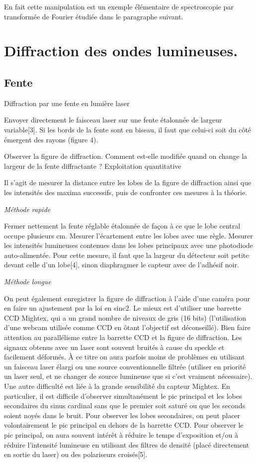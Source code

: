 \documentclass{article}%
\begin{document}
En fait cette manipulation est un exemple élémentaire de spectroscopie par transformée de Fourier étudiée dans le paragraphe suivant. 

\section{Diffraction des ondes lumineuses.}
\subsection{Fente}
Diffraction par une fente en lumière laser

Envoyer directement le faisceau laser sur une fente étalonnée de largeur variable[3]. Si les bords de la fente sont en biseau, il faut que celui-ci soit du côté émergent des rayons (figure 4).

Observer la figure de diffraction. Comment est-elle modifiée quand on change la largeur de la fente diffractante ?
Exploitation quantitative

Il s'agit de mesurer la distance entre les lobes de la figure de diffraction ainsi que les intensités des maxima successifs, puis de confronter ces mesures à la théorie.

\textit{Méthode rapide}

    Fermer nettement la fente réglable étalonnée de façon à ce que le lobe central occupe plusieurs cm. Mesurer l'écartement entre les lobes avec une règle. Mesurer les intensités lumineuses contenues dans les lobes principaux avec une photodiode auto-alimentée. Pour cette mesure, il faut que la largeur du détecteur soit petite devant celle d'un lobe[4], sinon diaphragmer le capteur avec de l'adhésif noir.

\textit{Méthode longue}

    On peut également enregistrer la figure de diffraction à l'aide d'une caméra pour en faire un ajustement par la loi en sinc2. Le mieux est d'utiliser une barrette CCD Mightex, qui a un grand nombre de niveaux de gris (16 bits) (l'utilisation d'une webcam utilisée comme CCD en ôtant l'objectif est déconseillé). Bien faire attention au parallélisme entre la barrette CCD et la figure de diffraction.
    Les signaux obtenus avec un laser sont souvent bruités à cause du speckle et facilement déformés. À ce titre on aura parfois moins de problèmes en utilisant un faisceau laser élargi ou une source conventionnelle filtrée (utiliser en priorité un laser seul, et ne changer de source lumineuse que si c'est vraiment nécessaire).
    Une autre difficulté est liée à la grande sensibilité du capteur Mightex. En particulier, il est difficile d'observer simultanément le pic principal et les lobes secondaires du sinus cardinal sans que le premier soit saturé ou que les seconds soient noyés dans le bruit. Pour observer les lobes secondaires, on peut placer volontairement le pic principal en dehors de la barrette CCD. Pour observer le pic principal, on aura souvent intérêt à réduire le temps d'exposition et/ou à réduire l'intensité lumineuse en utilisant des filtres de densité (placé directement en sortie du laser) ou des polariseurs croisés[5].
\end{document}
